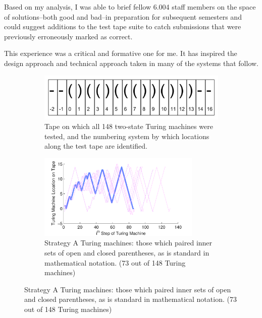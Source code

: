Based on my analysis, I was able to brief fellow 6.004 staff members on the space of solutions--both good and bad--in preparation for subsequent semesters and could suggest additions to the test tape suite to catch submissions that were previously erroneously marked as correct. 

This experience was a critical and formative one for me. It has inspired the design approach and technical approach taken in many of the systems that follow.

\begin{figure}[p]

\begin{subfigure}[b]{1.0\textwidth}
\centering
\includegraphics[width=140mm]{Body/figures/ICERtapeLocations.png}
\caption{Tape on which all 148 two-state Turing machines were tested, and the numbering system by which locations along the test tape are identified.}
\label{tapeLocations}
\end{subfigure}

\begin{subfigure}[b]{1.0\textwidth}
\centering
\includegraphics[width=0.85\textwidth]{Body/figures/tmvisualization_InnerParensMatched_allkidsAnno2}
\caption{Strategy A Turing machines: those which paired inner sets of open and closed parentheses, as is standard in mathematical notation. (73 out of 148 Turing machines)}
\label{tapeMoveA}
\end{subfigure}


\end{figure}

